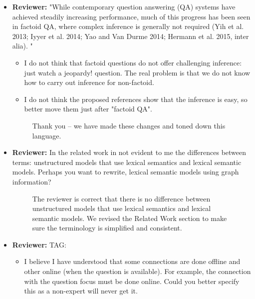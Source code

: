 \documentclass[10pt]{article}
\newcommand{\todo}[1]{\textcolor{red}{TODO: #1}}
\begin{document}

\begin{itemize}
  \item \textbf{Reviewer:} "While contemporary question answering (QA) systems have achieved
steadily increasing performance, much of this progress has been seen in
factoid QA, where complex inference is generally not required (Yih et al.
2013; Iyyer et al. 2014; Yao and Van Durme 2014; Hermann et al. 2015, inter
alia). "
\begin{itemize}
\item I do not think that factoid questions do not offer challenging
inference: just watch a jeopardy! question.
The real problem is that we do not know how to carry out inference for
non-factoid.

\item I do not think the proposed references show that the inference is easy,
so better move them just after "factoid QA".
\end{itemize}


\begin{figure}[H]
\caption{ Thank you -- we have made these changes and toned down this language. }
\end{figure}


\item \textbf{Reviewer:} In the related work in not evident to me the differences between terms:
unstructured models that use lexical semantics and lexical semantic models.
Perhaps you want to rewrite, lexical semantic models using graph
information?

\begin{figure}[H]
\caption{The reviewer is correct that there is no difference between unstructured models that use lexical semantics and lexical semantic models. We revised the Related Work section to make sure the terminology is simplified and consistent.}
\end{figure}

\item \textbf{Reviewer:} TAG:
\begin{itemize}
\item I believe I have understood that some connections are done offline and
other online (when the question is available).
For example, the connection with the question focus must be done online.
Could you better specify this as a non-expert will never get it.
\end{itemize}


\end{itemize}
\end{document}

